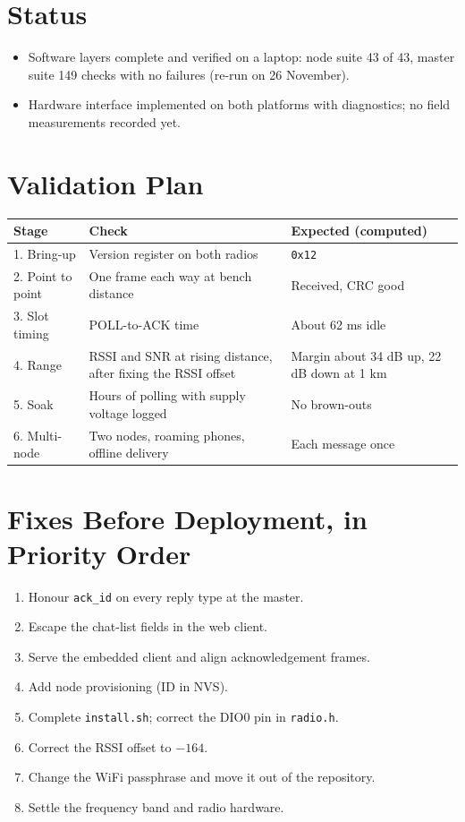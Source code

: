 \documentclass{tietreport}
\begin{document}
\section{Status}

\begin{itemize}
  \item Software layers complete and verified on a laptop: node suite
    43 of 43, master suite 149 checks with no failures (re-run on
    26 November).
  \item Hardware interface implemented on both platforms with
    diagnostics; no field measurements recorded yet.
\end{itemize}

\section{Validation Plan}

\begin{longtable}{|p{1.4in}|p{2.5in}|p{1.5in}|}
  \hline
  \textbf{Stage} & \textbf{Check} & \textbf{Expected (computed)} \\
  \hline
  \endhead
  1. Bring-up & Version register on both radios & \texttt{0x12} \\
  \hline
  2. Point to point & One frame each way at bench distance &
  Received, CRC good \\
  \hline
  3. Slot timing & POLL-to-ACK time & About 62 ms idle \\
  \hline
  4. Range & RSSI and SNR at rising distance, after fixing the
  RSSI offset & Margin about 34 dB up, 22 dB down at 1 km \\
  \hline
  5. Soak & Hours of polling with supply voltage logged &
  No brown-outs \\
  \hline
  6. Multi-node & Two nodes, roaming phones, offline delivery &
  Each message once \\
  \hline
\end{longtable}

\section{Fixes Before Deployment, in Priority Order}

\begin{enumerate}
  \item Honour \texttt{ack\_id} on every reply type at the master.
  \item Escape the chat-list fields in the web client.
  \item Serve the embedded client and align acknowledgement frames.
  \item Add node provisioning (ID in NVS).
  \item Complete \texttt{install.sh}; correct the DIO0 pin in
    \texttt{radio.h}.
  \item Correct the RSSI offset to $-164$.
  \item Change the WiFi passphrase and move it out of the repository.
  \item Settle the frequency band and radio hardware.
\end{enumerate}
\end{document}
